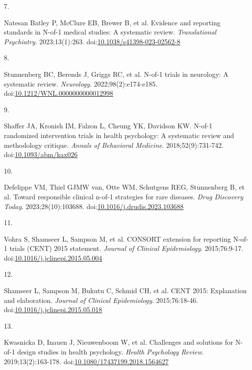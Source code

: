 \documentclass[
  11pt,
]{article}
\newlength{\cslhangindent}
\newlength{\csllabelwidth}
\newenvironment{CSLReferences}[2] %
 {\begin{list}{}{%
  \setlength{\itemindent}{0pt}
  \setlength{\leftmargin}{0pt}
  \setlength{\parsep}{0pt}
  \ifodd #1
   \setlength{\leftmargin}{\cslhangindent}
   \setlength{\itemindent}{-1\cslhangindent}
  \fi
  \setlength{\itemsep}{#2\baselineskip}}}
 {\end{list}}
\newcommand{\CSLLeftMargin}[1]{\parbox[t]{\csllabelwidth}{\strut#1\strut}}
\newcommand{\CSLRightInline}[1]{\parbox[t]{\linewidth - \csllabelwidth}{\strut#1\strut}}
\begin{document}
\begin{CSLReferences}{0}{1}
\CSLLeftMargin{7. }%
\CSLRightInline{Natesan Batley P, McClure EB, Brewer B, et al. Evidence and reporting standards in {N}-of-1 medical studies: A systematic review. \emph{Translational Psychiatry}. 2023;13(1):263. doi:\href{https://doi.org/10.1038/s41398-023-02562-8}{10.1038/s41398-023-02562-8}}

\CSLLeftMargin{8. }%
\CSLRightInline{Stunnenberg BC, Berends J, Griggs RC, et al. {N}-of-1 trials in neurology: A systematic review. \emph{Neurology}. 2022;98(2):e174-e185. doi:\href{https://doi.org/10.1212/WNL.0000000000012998}{10.1212/WNL.0000000000012998}}

\CSLLeftMargin{9. }%
\CSLRightInline{Shaffer JA, Kronish IM, Falzon L, Cheung YK, Davidson KW. {N}-of-1 randomized intervention trials in health psychology: A systematic review and methodology critique. \emph{Annals of Behavioral Medicine}. 2018;52(9):731-742. doi:\href{https://doi.org/10.1093/abm/kax026}{10.1093/abm/kax026}}

\CSLLeftMargin{10. }%
\CSLRightInline{{Defelippe VM, Thiel GJMW van, Otte WM, Schutgens REG, Stunnenberg B, et al.} Toward responsible clinical {n}-of-1 strategies for rare diseases. \emph{Drug Discovery Today}. 2023;28(10):103688. doi:\href{https://doi.org/10.1016/j.drudis.2023.103688}{10.1016/j.drudis.2023.103688}}

\CSLLeftMargin{11. }%
\CSLRightInline{{Vohra S, Shamseer L, Sampson M, et al.} {CONSORT} extension for reporting {N}-of-1 trials ({CENT}) 2015 statement. \emph{Journal of Clinical Epidemiology}. 2015;76:9-17. doi:\href{https://doi.org/10.1016/j.jclinepi.2015.05.004}{10.1016/j.jclinepi.2015.05.004}}

\CSLLeftMargin{12. }%
\CSLRightInline{{Shamseer L, Sampson M, Bukutu C, Schmid CH, et al.} {CENT} 2015: Explanation and elaboration. \emph{Journal of Clinical Epidemiology}. 2015;76:18-46. doi:\href{https://doi.org/10.1016/j.jclinepi.2015.05.018}{10.1016/j.jclinepi.2015.05.018}}

\CSLLeftMargin{13. }%
\CSLRightInline{{Kwasnicka D, Inauen J, Nieuwenboom W, et al.} Challenges and solutions for {N}-of-1 design studies in health psychology. \emph{Health Psychology Review}. 2019;13(2):163-178. doi:\href{https://doi.org/10.1080/17437199.2018.1564627}{10.1080/17437199.2018.1564627}}


\end{CSLReferences}
\end{document}
